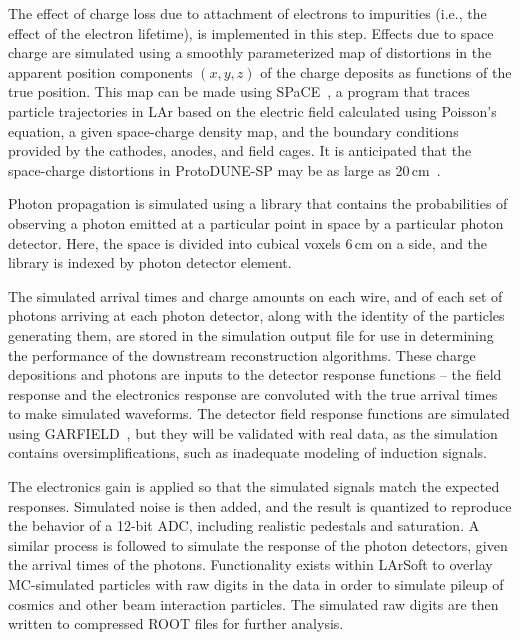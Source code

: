 The effect of charge loss due to attachment
of electrons to impurities (i.e., the effect of the electron lifetime),  is
implemented in this step.  
Effects due to space charge are simulated using a smoothly parameterized
map of
distortions in the apparent position components $(x,y,z)$ of the charge
deposits as
functions of the true position.
This map can be made using SPaCE~\cite{Mooney:2015kke}, a
program that traces particle trajectories in LAr based on the
electric field calculated using Poisson's equation, a given
space-charge density map, and the boundary conditions provided by the
cathodes, anodes, and field cages.  It is anticipated that the
space-charge distortions in ProtoDUNE-SP may be as large as
20\,cm~\cite{Mooney:2015kke}. 


Photon propagation is simulated using a library that contains the
probabilities of observing a photon emitted at a particular point in
space by a particular photon detector.  Here, the space is divided
into cubical voxels 6\,cm on a side, and the library is indexed by photon
detector element. 

The simulated arrival times and charge amounts on each wire, and of
each set of photons arriving at each photon detector, along with the
identity of the particles generating them, are stored in the
simulation output file for use in determining the performance of the
downstream reconstruction algorithms.  These charge depositions and
photons are inputs to the detector response functions -- the field
response and the electronics response are convoluted with the true
arrival times to make simulated waveforms.  The detector field
response functions are simulated using GARFIELD~\cite{garfield}, but
they will be validated with real data, as the simulation contains
oversimplifications, such as inadequate modeling of induction signals.  

The electronics gain is applied so that the
simulated signals match the expected responses.  Simulated noise is
then added, and the result is quantized to reproduce the behavior of a
12-bit ADC, including realistic pedestals and saturation.  A similar
process is followed to simulate the response of the photon detectors,
given the arrival times of the photons.  Functionality exists within
LArSoft to overlay MC-simulated particles with raw digits in
the data in order to simulate pileup of cosmics and other beam
interaction particles. The simulated raw digits are then written to
compressed ROOT files for further analysis.


